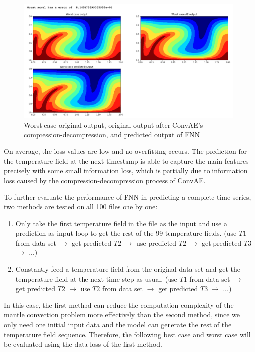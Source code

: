 \begin{figure}[H]
    \caption{Worst case original output, original output after ConvAE's compression-decompression, and predicted output of FNN}
    \includegraphics[scale=0.5]{Report LaTeX/figures/mantle_convection_images/limited_dataset/FNN_Worst.png}
\end{figure}

On average, the loss values are low and no overfitting occurs. The prediction for the temperature field at the next timestamp is able to capture the main features precisely with some small information loss, which is partially due to information loss caused by the compression-decompression process of ConvAE.

To further evaluate the performance of FNN in predicting a complete time series, two methods are tested on all 100 files one by one: 

\begin{enumerate}
  \item Only take the first temperature field in the file as the input and use a prediction-as-input loop to get the rest of the 99 temperature fields. (use $T1$ from data set $\rightarrow$ get predicted $T2$ $\rightarrow$ use predicted $T2$ $\rightarrow$ get predicted $T3$ $\rightarrow$ ...)
  \item Constantly feed a temperature field from the original data set and get the temperature field at the next time step as usual. (use $T1$ from data set $\rightarrow$ get predicted $T2$ $\rightarrow$ use $T2$ from data set $\rightarrow$ get predicted $T3$ $\rightarrow$ ...)
\end{enumerate}

In this case, the first method can reduce the computation complexity of the mantle convection problem more effectively than the second method, since we only need one initial input data and the model can generate the rest of the temperature field sequence. Therefore, the following best case and worst case will be evaluated using the data loss of the first method.

